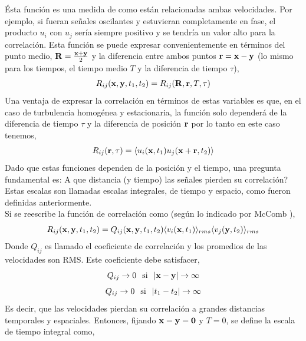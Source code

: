 \documentclass[executivepaper,12pt]{article}
\numberwithin{equation}{section}
\providecommand{\abs}[1]{\lvert#1\rvert}
\begin{document}
Ésta función es una medida de como están relacionadas ambas velocidades. Por ejemplo, si fueran señales oscilantes y estuvieran completamente en fase, el producto $u_i$ con $u_j$ sería siempre positivo y se tendría un valor alto para la correlación. Esta función se puede expresar convenientemente en términos del punto medio, $\vb{R}=\frac{\vb{x}+\vb{y}}{2}$ y la diferencia entre ambos puntos $\vb{r}=\vb{x}-\vb{y}$ (lo mismo para los tiempos, el tiempo medio $T$ y la diferencia de tiempo $\tau$),
\begin{equation*}
	R_{ij}(\vb{x},\vb{y},t_1,t_2)=R_{ij}(\vb{R},\vb{r},T,\tau)
\end{equation*}
Una ventaja de expresar la correlación en términos de estas variables es que, en el caso de turbulencia homogénea y estacionaria, la función solo dependerá de la diferencia de tiempo $\tau$ y la diferencia de posición $\vb{r}$ por lo tanto en este caso tenemos,
\begin{equation*}
	R_{ij}(\vb{r},\tau)=\langle u_i(\vb{x},t_1)u_j(\vb{x}+\vb{r},t_2)\rangle
\end{equation*}
Dado que estas funciones dependen de la posición y el tiempo, una pregunta fundamental es: A que distancia (y tiempo) las señales pierden su correlación? Estas escalas son llamadas escalas integrales, de tiempo y espacio, como fueron definidas anteriormente. \\
Si se reescribe la función de correlación como (según lo indicado por McComb \parencite{mccomb1990}),
\begin{equation*}
	R_{ij}(\vb{x},\vb{y},t_1,t_2)=Q_{ij}(\vb{x},\vb{y},t_1,t_2)\langle v_i(\vb{x},t_1)\rangle_{rms}\langle v_j(\vb{y},t_2)\rangle_{rms}
\end{equation*}
Donde  $Q_{ij}$ es llamado el coeficiente de correlación y los promedios de las velocidades son RMS. Este coeficiente debe satisfacer,
\begin{equation*}
	Q_{ij}\to 0 \hspace{0.25cm} \text{si}\hspace{0.25cm} \abs{\vb{x}-\vb{y}}\to\infty 
\end{equation*} 
\begin{equation*}
Q_{ij}\to 0 \hspace{0.25cm} \text{si}\hspace{0.25cm} \abs{t_1-t_2}\to\infty 
\end{equation*}
Es decir, que las velocidades pierdan su correlación a grandes distancias temporales y espaciales. Entonces, fijando $\vb{x}=\vb{y}=\vb{0}$ y $T=0$, se define la escala de tiempo integral como,
\end{document}
